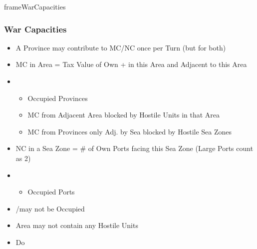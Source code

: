 \documentclass[10pt]{article}
\newlength{\fhWarCapacities} \setlength\fhWarCapacities{17\baselineskip}
\begin{document}
\begin{dynamiccontents*}{frameWarCapacities}\begin{eubox}{\fhWarCapacities}
	\subsubsection*{War Capacities }
	\begin{itemize}
		\item A Province may contribute to MC/NC once per Turn (but for both)
	\end{itemize}	
	\begin{itemize}
		\item MC in Area = Tax Value of Own \towns + \vassals in this Area and Adjacent to this Area
		\item {}
		\begin{itemize}
			\item Occupied Provinces
			\item MC from Adjacent Area blocked by Hostile Units in that Area
			\item MC from Provinces only Adj. by Sea blocked by Hostile Sea Zones
		\end{itemize}
	\end{itemize}
	\begin{itemize}
		\item NC in a Sea Zone = \# of Own Ports facing this Sea Zone (Large Ports count as 2)
		\item {}
		\begin{itemize}
			\item Occupied Ports
		\end{itemize}
	\end{itemize}
\end{eubox}\end{dynamiccontents*}

\begin{itemize}
	\item \town/\vassal may not be Occupied
	\item Area may not contain any Hostile Units
\end{itemize}

\begin{itemize}
	\item Do   
\end{itemize}
\end{document}
